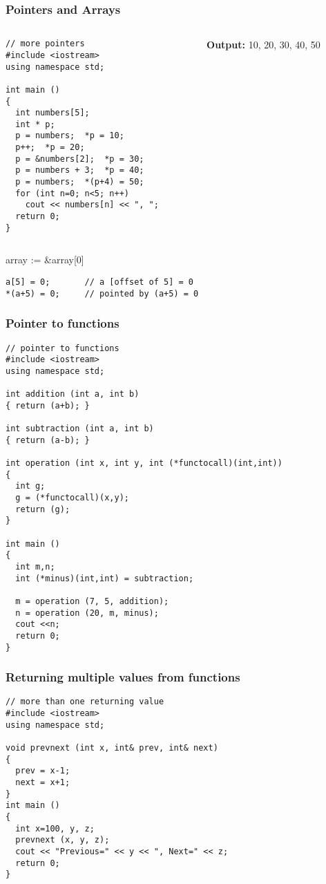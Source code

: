 \documentclass{beamer}
\newtheorem{Key points}{Key points}
\newcommand\Fontvia{\fontsize{6}{7.2}\selectfont}
\newcommand\Fontviaa{\fontsize{8}{7.2}\selectfont}
\begin{document}
\begin{frame}[fragile]
\frametitle{Pointers and Arrays}
\begin{columns}[onlytextwidth]
    \begin{column}{0.6\textwidth}
      \centering
\Fontvia
\begin{lstlisting}
// more pointers
#include <iostream>
using namespace std;

int main ()
{
  int numbers[5];
  int * p;
  p = numbers;  *p = 10;
  p++;  *p = 20;
  p = &numbers[2];  *p = 30;
  p = numbers + 3;  *p = 40;
  p = numbers;  *(p+4) = 50;
  for (int n=0; n<5; n++)
    cout << numbers[n] << ", ";
  return 0;
}
\end{lstlisting}
    \end{column}
\pause    \begin{column}{0.3\textwidth}
      \centering
\textbf{{\color{blue}Output:}} 10, 20, 30, 40, 50
    \end{column}
\end{columns}
\Fontviaa
\begin{definition}
\centering
array := \&array[0]
\end{definition}
\begin{lstlisting}
a[5] = 0;       // a [offset of 5] = 0
*(a+5) = 0;     // pointed by (a+5) = 0
\end{lstlisting}
\end{frame}
\begin{frame}[fragile]
\frametitle{Pointer to functions}
\Fontvia
\begin{lstlisting}
// pointer to functions
#include <iostream>
using namespace std;

int addition (int a, int b)
{ return (a+b); }

int subtraction (int a, int b)
{ return (a-b); }

int operation (int x, int y, int (*functocall)(int,int))
{
  int g;
  g = (*functocall)(x,y);
  return (g);
}

int main ()
{
  int m,n;
  int (*minus)(int,int) = subtraction;

  m = operation (7, 5, addition);
  n = operation (20, m, minus);
  cout <<n;
  return 0;
}
\end{lstlisting}
\end{frame}
\begin{frame}[fragile]
\frametitle{Returning multiple values from functions}
\Fontviaa
\begin{lstlisting}
// more than one returning value
#include <iostream>
using namespace std;

void prevnext (int x, int& prev, int& next)
{
  prev = x-1;
  next = x+1;
}
int main ()
{
  int x=100, y, z;
  prevnext (x, y, z);
  cout << "Previous=" << y << ", Next=" << z;
  return 0;
}
\end{lstlisting}
\end{frame}
\end{document}
